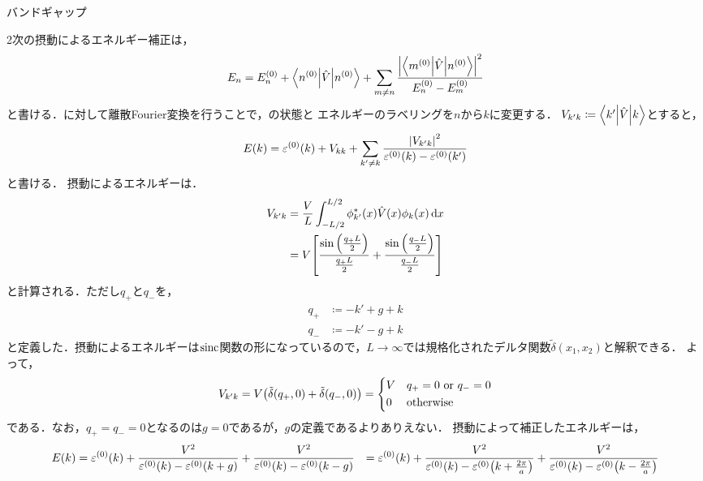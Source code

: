 \documentclass{report}
\begin{document}
\begin{myex}{バンドギャップ}{}
\begin{enumerate}
        2次の摂動によるエネルギー補正は，
        \begin{align}
          E_n = E_n^{(0)} + \mel**{n^{(0)}}{\hat{V}}{n^{(0)}} + \sum_{m\neq n}\frac{\abs{\mel**{m^{(0)}}{\hat{V}}{n^{(0)}}}^2}{E_n^{(0)} - E_m^{(0)}} \label{2nd-order-perturbation-eigenvalue-re}
        \end{align}
        と書ける．に対して離散Fourier変換を行うことで，の状態と
        エネルギーのラベリングを$n$から$k$に変更する．
        $V_{k'k} \coloneqq \mel**{k'}{\hat{V}}{k}$とすると，
        \begin{align}
          E(k) = \varepsilon^{(0)}(k) + V_{kk} + \sum_{k'\neq k}\frac{\abs{V_{k'k}}^2}{\varepsilon^{(0)}(k) - \varepsilon^{(0)}(k')}
        \end{align}
        と書ける．
        摂動によるエネルギーは．
        \begin{align}
          V_{k'k} &= \frac{V}{L}\int_{-L/2}^{L/2}\phi_{k'}^{*}(x)\hat{V}(x)\phi_k(x)\dd{x} \\
          &= V\qty[\frac{\sin\qty(\frac{q_+L}{2})}{\frac{q_+L}{2}} + \frac{\sin\qty(\frac{q_-L}{2})}{\frac{q_-L}{2}}] 
        \end{align}
        と計算される．ただし$q_+$と$q_-$を，
        \begin{align}
          q_+ &\coloneqq -k' + g + k \\ 
          q_- &\coloneqq -k' - g + k
        \end{align}
        と定義した．摂動によるエネルギーは$\mathrm{sinc}$関数の形になっているので，$L\to\infty$では規格化されたデルタ関数$\tilde{\delta}(x_1, x_2)$と解釈できる．
        よって，
        \begin{align}
          V_{k'k} = V\qty(\tilde{\delta}(q_+, 0) + \tilde{\delta}(q_-, 0)) = 
          \begin{dcases}
            V & q_+ = 0\ \mathrm{or}\ q_- = 0\\
            0 & \mathrm{otherwise}
          \end{dcases}
        \end{align}
        である．なお，$q_+ = q_- = 0$となるのは$g = 0$であるが，$g$の定義であるよりありえない．
        摂動によって補正したエネルギーは，
        \begin{align}
          E(k) &= \epsilon^{(0)}(k) + \frac{V^2}{\epsilon^{(0)}(k) - \epsilon^{(0)}(k + g)} + \frac{V^2}{\epsilon^{(0)}(k) - \epsilon^{(0)}(k - g)}
          &= \epsilon^{(0)}(k) + \frac{V^2}{\epsilon^{(0)}(k) - \epsilon^{(0)}\qty(k + \frac{2\pi}{a})} + \frac{V^2}{\epsilon^{(0)}(k) - \epsilon^{(0)}\qty(k - \frac{2\pi}{a})}\label{2nd-order-perturbation-eigenvalue-in-electron}

\end{align}
\end{enumerate}
\end{myex}
\end{document}
